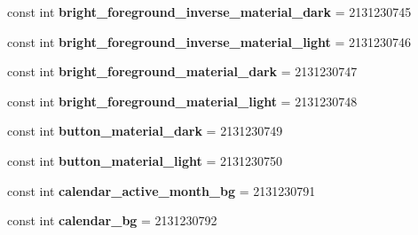 \begin{DoxyCompactItemize}
\item 
\hypertarget{classClient_1_1Droid_1_1Resource_1_1Color_abce57e4269c4c604b1f5e85354995183}{}const int {\bfseries bright\+\_\+foreground\+\_\+inverse\+\_\+material\+\_\+dark} = 2131230745\label{classClient_1_1Droid_1_1Resource_1_1Color_abce57e4269c4c604b1f5e85354995183}

\item 
\hypertarget{classClient_1_1Droid_1_1Resource_1_1Color_a4708713f76f994e470e2744e1db6969b}{}const int {\bfseries bright\+\_\+foreground\+\_\+inverse\+\_\+material\+\_\+light} = 2131230746\label{classClient_1_1Droid_1_1Resource_1_1Color_a4708713f76f994e470e2744e1db6969b}

\item 
\hypertarget{classClient_1_1Droid_1_1Resource_1_1Color_a355a6a8af748944f0c8269115681e0c1}{}const int {\bfseries bright\+\_\+foreground\+\_\+material\+\_\+dark} = 2131230747\label{classClient_1_1Droid_1_1Resource_1_1Color_a355a6a8af748944f0c8269115681e0c1}

\item 
\hypertarget{classClient_1_1Droid_1_1Resource_1_1Color_aaa0bb4bbc352eaac5af25e8dc1242ef0}{}const int {\bfseries bright\+\_\+foreground\+\_\+material\+\_\+light} = 2131230748\label{classClient_1_1Droid_1_1Resource_1_1Color_aaa0bb4bbc352eaac5af25e8dc1242ef0}

\item 
\hypertarget{classClient_1_1Droid_1_1Resource_1_1Color_adabbd62c7681e1976c059d0e78952e24}{}const int {\bfseries button\+\_\+material\+\_\+dark} = 2131230749\label{classClient_1_1Droid_1_1Resource_1_1Color_adabbd62c7681e1976c059d0e78952e24}

\item 
\hypertarget{classClient_1_1Droid_1_1Resource_1_1Color_a4085808b8acb61fc5eb6f943fdf528f7}{}const int {\bfseries button\+\_\+material\+\_\+light} = 2131230750\label{classClient_1_1Droid_1_1Resource_1_1Color_a4085808b8acb61fc5eb6f943fdf528f7}

\item 
\hypertarget{classClient_1_1Droid_1_1Resource_1_1Color_aad99f97dec004bb242677313ef673f06}{}const int {\bfseries calendar\+\_\+active\+\_\+month\+\_\+bg} = 2131230791\label{classClient_1_1Droid_1_1Resource_1_1Color_aad99f97dec004bb242677313ef673f06}

\item 
\hypertarget{classClient_1_1Droid_1_1Resource_1_1Color_a1f3b2b6fa757627e744f0003912bc37c}{}const int {\bfseries calendar\+\_\+bg} = 2131230792\label{classClient_1_1Droid_1_1Resource_1_1Color_a1f3b2b6fa757627e744f0003912bc37c}


\end{DoxyCompactItemize}
